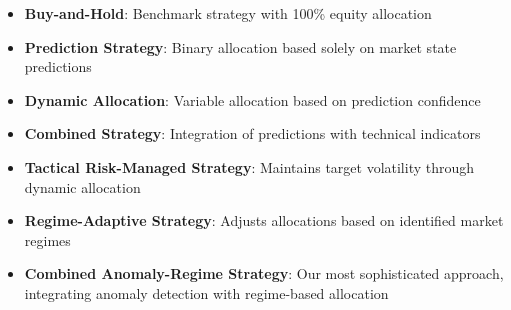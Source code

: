 \documentclass[13pt]{article}
\begin{document}
\begin{itemize}
	\item \textbf{Buy-and-Hold}: Benchmark strategy with 100\% equity allocation

	\item \textbf{Prediction Strategy}: Binary allocation based solely on market state predictions

	\item \textbf{Dynamic Allocation}: Variable allocation based on prediction confidence

	\item \textbf{Combined Strategy}: Integration of predictions with technical indicators

	\item \textbf{Tactical Risk-Managed Strategy}: Maintains target volatility through dynamic allocation

	\item \textbf{Regime-Adaptive Strategy}: Adjusts allocations based on identified market regimes

	\item \textbf{Combined Anomaly-Regime Strategy}: Our most sophisticated approach, integrating anomaly detection with regime-based allocation
\end{itemize}
\end{document}
